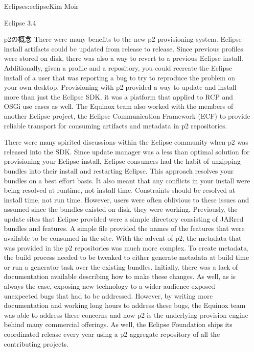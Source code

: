 \begin{aosachapter}{Eclipse}{s:eclipse}{Kim Moir}
\begin{aosasect1}{Eclipse 3.4}
\begin{aosasect2}{p2の概念}
There were many benefits to the new p2 provisioning system. Eclipse
install artifacts could be updated from release to release. Since
previous profiles were stored on disk, there was also a way to revert
to a previous Eclipse install. Additionally, given a profile and a
repository, you could recreate the Eclipse install of a user that was
reporting a bug to try to reproduce the problem on your own desktop.
Provisioning with p2 provided a way to update and install more than
just the Eclipse SDK, it was a platform that applied to RCP and OSGi
use cases as well.  The Equinox team also worked with the members of
another Eclipse project, the Eclipse Communication Framework (ECF) to
provide reliable transport for consuming artifacts and metadata in p2
repositories.

There were many spirited discussions within the Eclipse community when p2
was released into the SDK\@. Since update manager was a less than
optimal solution for provisioning your Eclipse install, Eclipse
consumers had the habit of unzipping bundles into their install and
restarting Eclipse. This approach resolves your bundles on a best
effort basis. It also meant that any conflicts in your install were
being resolved at runtime, not install time.  Constraints should be
resolved at install time, not run time. However, users were often
oblivious to these issues and assumed since the bundles existed on
disk, they were working.  Previously, the update sites that Eclipse
provided were a simple directory consisting of JARred bundles and
features.  A simple  file provided the names of the
features that were available to be consumed in the site.  With the
advent of p2, the metadata that was provided in the p2 repositories
was much more complex. To create metadata, the build process needed to
be tweaked to either generate metadata at build time or run a
generator task over the existing bundles. Initially, there was a lack
of documentation available describing how to make these changes.  As
well, as is always the case, exposing new technology to a wider
audience exposed unexpected bugs that had to be addressed. However, by
writing more documentation and working long hours to address these
bugs, the Equinox team was able to address these concerns and now p2
is the underlying provision engine behind many commercial
offerings. As well, the Eclipse Foundation ships its coordinated
release every year using a p2 aggregate repository of all the
contributing projects.

\end{aosasect2}


\end{aosasect1}
\end{aosachapter}
